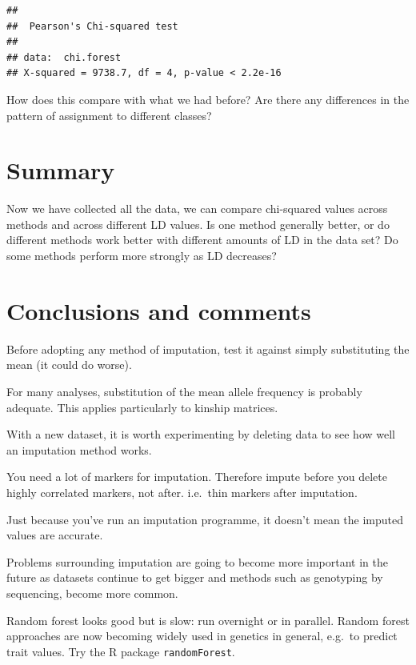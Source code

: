 \documentclass[
]{book}
\makeatletter
\newenvironment{kframe}{%
\medskip{}
\setlength{\fboxsep}{.8em}
 \def\at@end@of@kframe{}%
 \ifinner\ifhmode%
  \def\at@end@of@kframe{\end{minipage}}%
  \begin{minipage}{\columnwidth}%
 \fi\fi%
 \def\FrameCommand##1{\hskip\@totalleftmargin \hskip-\fboxsep
 \colorbox{shadecolor}{##1}\hskip-\fboxsep
     \hskip-\linewidth \hskip-\@totalleftmargin \hskip\columnwidth}%
 \MakeFramed {\advance\hsize-\width
   \@totalleftmargin\z@ \linewidth\hsize
   \@setminipage}}%
 {\par\unskip\endMakeFramed%
 \at@end@of@kframe}
\newenvironment{rmdblock}[1]
  {
  \begin{itemize}
  \renewcommand{\labelitemi}{
    \raisebox{-.7\height}[0pt][0pt]{
      {\setkeys{Gin}{width=3em,keepaspectratio}\texttt{[image: images/\#1]}}
    }
  }
  \setlength{\fboxsep}{1em}
  \begin{kframe}
  \item
  }
  {
  \end{kframe}
  \end{itemize}
  }
\newenvironment{rmdquiz}
  {\begin{rmdblock}{quiz}}
  {\end{rmdblock}}
\makeatother
\begin{document}
\begin{verbatim}
## 
##  Pearson's Chi-squared test
## 
## data:  chi.forest
## X-squared = 9738.7, df = 4, p-value < 2.2e-16
\end{verbatim}

How does this compare with what we had before? Are there any differences in the pattern of assignment to different classes?

\hypertarget{summary-1}{%
\section{Summary}\label{summary-1}}

\begin{rmdquiz}
Now we have collected all the data, we can compare chi-squared values across methods and across different LD values. Is one method generally better, or do different methods work better with different amounts of LD in the data set? Do some methods perform more strongly as LD decreases?
\end{rmdquiz}

\hypertarget{conclusions-and-comments}{%
\section{Conclusions and comments}\label{conclusions-and-comments}}

Before adopting any method of imputation, test it against simply substituting the mean (it could do worse).

For many analyses, substitution of the mean allele frequency is probably adequate. This applies particularly to kinship matrices.

With a new dataset, it is worth experimenting by deleting data to see how well an imputation method works.

You need a lot of markers for imputation. Therefore impute before you delete highly correlated markers, not after. i.e.~thin markers after imputation.

Just because you've run an imputation programme, it doesn't mean the imputed values are accurate.

Problems surrounding imputation are going to become more important in the future as datasets continue to get bigger and methods such as genotyping by sequencing, become more common.

Random forest looks good but is slow: run overnight or in parallel. Random forest approaches are now becoming widely used in genetics in general, e.g.~to predict trait values. Try the R package \texttt{randomForest}.
\end{document}
